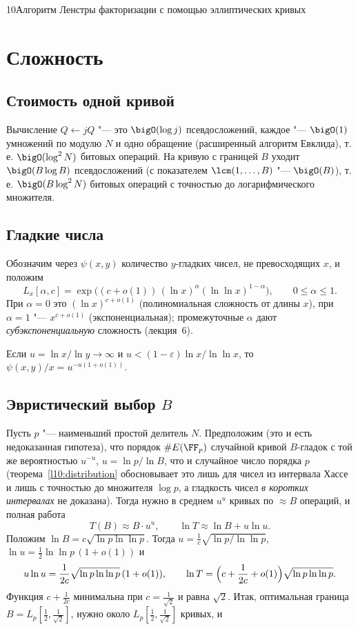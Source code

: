 \begin{lecture}{10}{Алгоритм Ленстры факторизации с помощью эллиптических кривых}
\section{Сложность}

\subsection{Стоимость одной кривой}

Вычисление $Q \gets jQ$ "--- это $\bigO(\log j)$ псевдосложений, каждое "--- $\bigO(1)$
умножений по модулю $N$ и одно обращение (расширенный алгоритм Евклида), т.\,е.
$\bigO(\log^2 N)$ битовых операций. На кривую с границей $B$ уходит $\bigO(B \log B)$
псевдосложений (с показателем $\lcm(1, \dots, B)$ "--- $\bigO(B)$), т.\,е.
$\bigO(B \log^2 N)$ битовых операций с точностью до логарифмического множителя.

\subsection{Гладкие числа}

Обозначим через $\psi(x, y)$ количество $y$-гладких чисел, не превосходящих $x$, и положим
\[
  L_x[\alpha, c] = \exp\bigl((c + o(1))\,(\ln x)^{\alpha} (\ln\ln x)^{1 - \alpha}\bigr),
  \qquad 0 \le \alpha \le 1.
\]
При $\alpha = 0$ это $(\ln x)^{c + o(1)}$ (полиномиальная сложность от длины $x$), при $\alpha = 1$
"--- $x^{c + o(1)}$ (экспоненциальная); промежуточные $\alpha$ дают \emph{субэкспоненциальную}
сложность (лекция~6).

\begin{theorem}\label{l10:cep}
Если $u = \ln x / \ln y \to \infty$ и $u < (1 - \varepsilon) \ln x/\ln\ln x$, то
$\psi(x, y)/x = u^{-u(1 + o(1))}$.
\end{theorem}

\subsection{Эвристический выбор \texorpdfstring{$B$}{B}}

Пусть $p$ "--- наименьший простой делитель $N$. Предположим (это и есть недоказанная
гипотеза), что порядок $\#E(\FF_p)$ случайной кривой $B$-гладок с той же вероятностью
$u^{-u}$, $u = \ln p / \ln B$, что и случайное число порядка $p$ (теорема~\ref{l10:distribution}
обосновывает это лишь для чисел из интервала Хассе и лишь с точностью до множителя $\log p$, а
гладкость чисел \emph{в коротких интервалах} не доказана). Тогда нужно в среднем $u^u$ кривых по
$\approx B$ операций, и полная работа
\[
  T(B) \approx B \cdot u^u, \qquad \ln T \approx \ln B + u \ln u.
\]
Положим $\ln B = c\sqrt{\ln p \ln\ln p}$. Тогда $u = \frac1c \sqrt{\ln p/\ln\ln p}$,
$\ln u = \frac12 \ln\ln p\,(1 + o(1))$ и
\[
  u \ln u = \frac{1}{2c}\sqrt{\ln p \ln\ln p}\,(1 + o(1)), \qquad
  \ln T = \Bigl(c + \frac{1}{2c} + o(1)\Bigr) \sqrt{\ln p \ln\ln p}.
\]
Функция $c + \frac{1}{2c}$ минимальна при $c = \frac{1}{\sqrt 2}$ и равна $\sqrt 2$. Итак,
оптимальная граница $B = L_p[\frac12, \frac{1}{\sqrt 2}]$, нужно около
$L_p[\frac12, \frac{1}{\sqrt 2}]$ кривых, и


\end{lecture}
